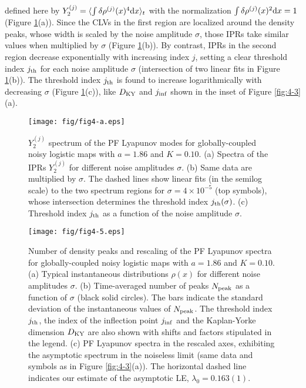 \documentclass[12pt]{iopart}
\begin{document}
 defined here by $Y_2^{(j)} = \langle \int \delta\rho^{(j)}(x)^4 \mathrm{d} x \rangle_t$
 with the normalization $\int \delta\rho^{(j)}(x)^2 \mathrm{d} x = 1$
 (Figure \ref{fig:4-a}(a)).
Since the CLVs in the first region are localized around the density peaks,
 whose width is scaled by the noise amplitude $\sigma$,
 those IPRs take similar values
 when multiplied by $\sigma$ (Figure \ref{fig:4-a}(b)).
By contrast, IPRs in the second region
 decrease exponentially with increasing index $j$,
 setting a clear threshold index $j_{\rm th}$
 for each noise amplitude $\sigma$
 (intersection of two linear fits in Figure \ref{fig:4-a}(b)).
The threshold index $j_{\rm th}$ is found to increase
 logarithmically with decreasing $\sigma$ (Figure \ref{fig:4-a}(c)),
 like $D_{\rm KY}$ and $j_{\rm inf}$
 shown in the inset of Figure \ref{fig:4-3}(a).

\begin{figure}[t]
 \begin{center}
  \texttt{[image: fig/fig4-a.eps]}
  \caption{$Y_2^{(j)}$ spectrum of the PF Lyapunov modes for globally-coupled noisy logistic maps  with $a=1.86$ and $K=0.10$. (a) Spectra of the IPRs $Y_2^{(j)}$ for different noise amplitudes $\sigma$. (b) Same data are multiplied by $\sigma$. The dashed lines show linear fits (in the semilog scale) to the two spectrum regions for $\sigma = 4 \times 10^{-5}$ (top symbols), whose intersection determines the threshold index $j_{\rm th}(\sigma)$. (c) Threshold index $j_{\rm th}$ as a function of the noise amplitude $\sigma$.}%
  \label{fig:4-a}
 \end{center}
\end{figure}%

\begin{figure}[t]
 \begin{center}
  \texttt{[image: fig/fig4-5.eps]}
  \caption{Number of density peaks and rescaling of the PF Lyapunov spectra for globally-coupled noisy logistic maps  with $a=1.86$ and $K=0.10$. (a) Typical instantaneous distributions $\rho(x)$ for different noise amplitudes $\sigma$. (b) Time-averaged number of peaks $N_{\rm peak}$ as a function of $\sigma$ (black solid circles). The bars indicate the standard deviation of the instantaneous values of $N_{\rm peak}$. The threshold index $j_{\rm th}$, the index of the inflection point $j_{\rm inf}$ and the Kaplan-Yorke dimension $D_{\rm KY}$ are also shown with shifts and factors stipulated in the legend. (c) PF Lyapunov spectra in the rescaled axes, exhibiting the asymptotic spectrum in the noiseless limit (same data and symbols as in Figure \ref{fig:4-3}(a)). The horizontal dashed line indicates our estimate of the asymptotic LE, $\lambda_0 = 0.163(1)$.
}
  \label{fig:4-5}
 \end{center}
\end{figure}%
\end{document}
